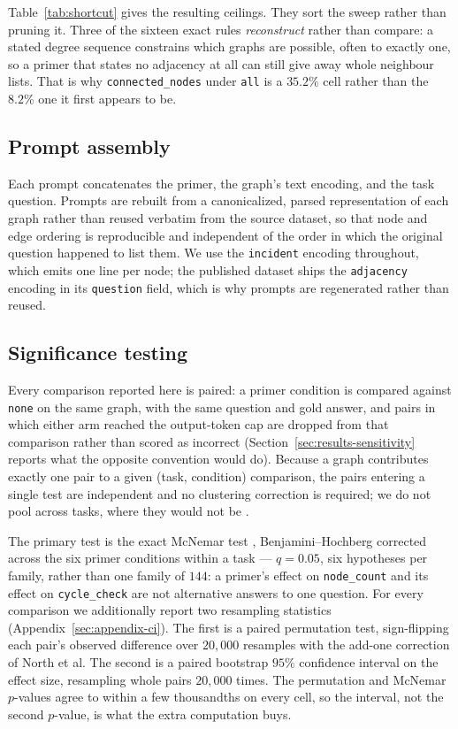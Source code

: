 \documentclass[11pt]{article}
\begin{document}
Table~\ref{tab:shortcut} gives the resulting ceilings. They sort the sweep
rather than pruning it. Three of the sixteen exact rules \emph{reconstruct}
rather than compare: a stated degree sequence constrains which graphs are
possible, often to exactly one, so a primer that states no adjacency at all
can still give away whole neighbour lists. That is why
\texttt{connected\_nodes} under \texttt{all} is a $35.2\%$ cell rather than
the $8.2\%$ one it first appears to be.

\subsection{Prompt assembly}
\label{sec:prompts}

Each prompt concatenates the primer, the graph's text encoding, and the
task question. Prompts are rebuilt from a canonicalized, parsed
representation of each graph rather than reused verbatim from the source
dataset, so that node and edge ordering is reproducible and independent of
the order in which the original question happened to list them. We use the
\texttt{incident} encoding throughout, which emits one line per node; the
published dataset ships the \texttt{adjacency} encoding in its
\texttt{question} field, which is why prompts are regenerated rather than
reused.

\subsection{Significance testing}
\label{sec:significance}

Every comparison reported here is paired: a primer condition is compared
against \texttt{none} on the same graph, with the same question and gold
answer, and pairs in which either arm reached the output-token cap are
dropped from that comparison rather than scored as incorrect
(Section~\ref{sec:results-sensitivity} reports what the opposite convention
would do). Because a graph contributes exactly one pair to a given (task,
condition) comparison, the pairs entering a single test are independent and
no clustering correction is required; we do not pool across tasks, where
they would not be \citep{dror2018hitchhikers}.

The primary test is the exact McNemar test \citep{mcnemar1947note},
Benjamini--Hochberg corrected across the six primer conditions within a
task \citep{benjaminihochberg1995controlling} --- $q=0.05$, six hypotheses
per family, rather than one family of $144$: a primer's effect on
\texttt{node\_count} and its effect on \texttt{cycle\_check} are not
alternative answers to one question. For every comparison we additionally
report two resampling statistics (Appendix~\ref{sec:appendix-ci}). The
first is a paired permutation test, sign-flipping each pair's observed
difference over $20{,}000$ resamples with the add-one correction of North
et al. The second is a paired bootstrap $95\%$ confidence interval on the
effect size, resampling whole pairs $20{,}000$ times. The permutation and
McNemar $p$-values agree to within a few thousandths on every cell, so the
interval, not the second $p$-value, is what the extra computation buys.
\end{document}
